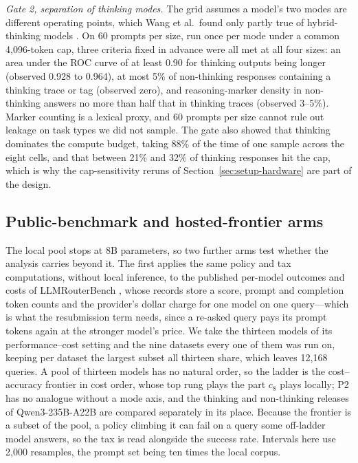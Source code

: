 \documentclass[final,5p,times,twocolumn]{elsarticle}
\theoremstyle{plain}
\begin{document}
\emph{Gate 2, separation of thinking modes.} The grid assumes a model's two
modes are different operating points, which Wang et al.\ found only partly
true of hybrid-thinking models \cite{wang2025demystifying}. On 60 prompts per
size, run once per mode under a common 4{,}096-token cap, three criteria
fixed in advance were all met at all four sizes: an area under the ROC curve
of at least 0.90 for thinking outputs being longer (observed 0.928 to 0.964),
at most 5\% of non-thinking responses containing a thinking trace or tag
(observed zero), and reasoning-marker density in non-thinking answers no more
than half that in thinking traces (observed 3--5\%). Marker counting is a
lexical proxy, and 60 prompts per size cannot rule out leakage on task types
we did not sample. The gate also showed that thinking dominates the compute
budget, taking 88\% of the time of one sample across the eight cells, and
that between 21\% and 32\% of thinking responses hit the cap, which is why
the cap-sensitivity reruns of Section~\ref{sec:setup-hardware} are part of
the design.

\subsection{Public-benchmark and hosted-frontier arms}
\label{sec:setup-arms}

The local pool stops at 8B parameters, so two further arms test whether the
analysis carries beyond it. The first applies the same policy and tax
computations, without local inference, to the published per-model outcomes
and costs of LLMRouterBench \cite{li2026llmrouterbench}, whose records store a
score, prompt and completion token counts and the provider's dollar charge
for one model on one query---which is what the resubmission term needs, since
a re-asked query pays its prompt tokens again at the stronger model's price.
We take the thirteen models of its performance--cost setting and the nine
datasets every one of them was run on, keeping per dataset the largest subset
all thirteen share, which leaves 12{,}168 queries. A pool of thirteen models
has no natural order, so the ladder is the cost--accuracy frontier in cost
order, whose top rung plays the part $c_8$ plays locally; P2 has no analogue
without a mode axis, and the thinking and non-thinking releases of
Qwen3-235B-A22B are compared separately in its place. Because the frontier is
a subset of the pool, a policy climbing it can fail on a query some
off-ladder model answers, so the tax is read alongside the success rate.
Intervals here use 2{,}000 resamples, the prompt set being ten times the
local corpus.
\end{document}
